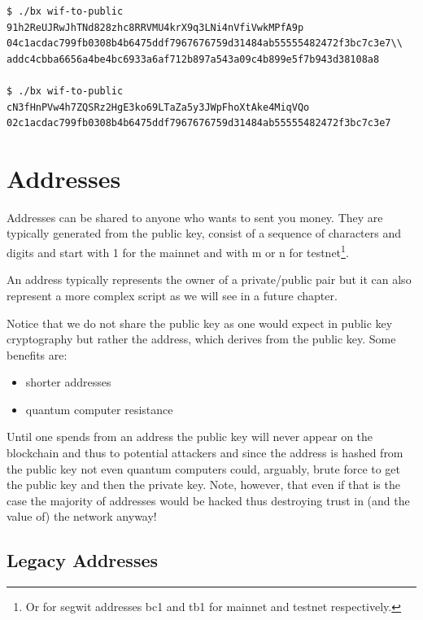 \begin{emphbox}
\begin{lstlisting}[style=Bash]
$ ./bx wif-to-public 91h2ReUJRwJhTNd828zhc8RRVMU4krX9q3LNi4nVfiVwkMPfA9p
04c1acdac799fb0308b4b6475ddf7967676759d31484ab55555482472f3bc7c3e7\\
addc4cbba6656a4be4bc6933a6af712b897a543a09c4b899e5f7b943d38108a8

$ ./bx wif-to-public cN3fHnPVw4h7ZQSRz2HgE3ko69LTaZa5y3JWpFhoXtAke4MiqVQo
02c1acdac799fb0308b4b6475ddf7967676759d31484ab55555482472f3bc7c3e7
\end{lstlisting}
\end{emphbox}


\section{Addresses}
\label{sec:addresses}
Addresses can be shared to anyone who wants to sent you money. They are typically generated from the public key, consist of a sequence of characters and digits and start with 1 for the mainnet and with m or n for testnet\footnote{Or for segwit addresses bc1 and tb1 for mainnet and testnet respectively.}.

An address typically represents the owner of a private/public pair but it can also represent a more complex script as we will see in a future chapter.

Notice that we do not share the public key as one would expect in public key cryptography but rather the address, which derives from the public key. Some benefits are:

\begin{itemize}
\item shorter addresses
\item quantum computer resistance
\end{itemize}

\begin{note}
Until one spends from an address the public key will never appear on the blockchain and thus to potential attackers and since the address is hashed from the public key not even quantum computers could, arguably, brute force to get the public key and then the private key. Note, however, that even if that is the case the majority of addresses would be hacked thus destroying trust in (and the value of) the network anyway!
\end{note}

\subsection*{Legacy Addresses}

